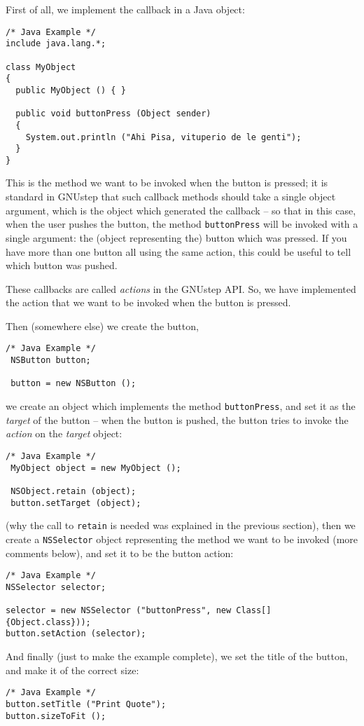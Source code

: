 First of all, we implement the callback in a Java object: 
\begin{verbatim}
/* Java Example */
include java.lang.*;

class MyObject
{
  public MyObject () { }

  public void buttonPress (Object sender)
  {
    System.out.println ("Ahi Pisa, vituperio de le genti");
  }
}
\end{verbatim}
This is the method we want to be invoked when the button is pressed;
it is standard in GNUstep that such callback methods should take a
single object argument, which is the object which generated the
callback -- so that in this case, when the user pushes the button, the
method \texttt{buttonPress} will be invoked with a single argument:
the (object representing the) button which was pressed.  If you have
more than one button all using the same action, this could be useful
to tell which button was pushed.

These callbacks are called \emph{actions} in the GNUstep API.  So, we
have implemented the action that we want to be invoked when the button
is pressed.

Then (somewhere else) we create the button, 
\begin{verbatim}
/* Java Example */
 NSButton button;

 button = new NSButton ();
\end{verbatim}
we create an object which implements the method \texttt{buttonPress},
and set it as the \emph{target} of the button -- when the button is
pushed, the button tries to invoke the \emph{action} on the
\emph{target} object:
\begin{verbatim}
/* Java Example */
 MyObject object = new MyObject (); 

 NSObject.retain (object);
 button.setTarget (object);
\end{verbatim}
(why the call to \texttt{retain} is needed was explained in the
previous section), then we create a \texttt{NSSelector} object
representing the method we want to be invoked (more comments below),
and set it to be the button action:
\begin{verbatim}
/* Java Example */
NSSelector selector;

selector = new NSSelector ("buttonPress", new Class[] {Object.class}));
button.setAction (selector);
\end{verbatim}
And finally (just to make the example complete), we set the title of
the button, and make it of the correct size:
\begin{verbatim}
/* Java Example */
button.setTitle ("Print Quote");
button.sizeToFit ();
\end{verbatim}


